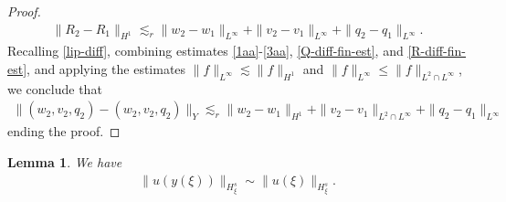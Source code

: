 \documentclass[12pt,reqno]{amsart}
\numberwithin{equation}{section}  %
\numberwithin{figure}{section}
\newtheorem{lemma}[theorem]{Lemma}
\begin{document}
\begin{proof}
\begin{equation}
\begin{split}
  \| R_{2} - R_{1} \|_{H^{1}} \lesssim_{r} \| w_{2} - w_{1} \|_{L^{\infty}} + \| v_{2} - v_{1} \|_{L^{\infty}}
+ \| q_{2} - q_{1} \|_{L^{\infty}}.
\end{split}
\end{equation}
%
%
Recalling \eqref{lip-diff}, combining estimates \eqref{1aa}-\eqref{3aa},
\eqref{Q-diff-fin-est}, and \eqref{R-diff-fin-est}, and applying the estimates
$\| f \|_{L^{\infty}} \lesssim \| f \|_{H^{1}}$ and $\| f \|_{L^{\infty}} \le \| f
\|_{L^{2} \cap L^{\infty}}$, we conclude that
%
%
%
\begin{equation*}
\begin{split}
  \|(w_{2}, v_{2}, q_{2}) - (w_{2}, v_{2}, q_{2})\|_{Y} \lesssim_{r} \| w_{2} - w_{1} \|_{H^{1}} + \| v_{2} - v_{1} \|_{L^{2} \cap L^{\infty}}  + \| q_{2} - q_{1} \|_{L^{\infty}}
\end{split}
\end{equation*}
%
%
ending the proof.
%
\end{proof} 
%
%
%
%
%
%
%
%
%
\begin{lemma}
We have
%
%
\begin{equation*}
\begin{split}
  \| u(y(\xi)) \|_{H^{s}_{\xi}} \sim \| u(\xi) \|_{H^{s}_{\xi}}.
\end{split}
\end{equation*}
%
%
%
%
%
%
\label{lem:norm-equiv}
\end{lemma}
%
%
%
%
\end{document}
